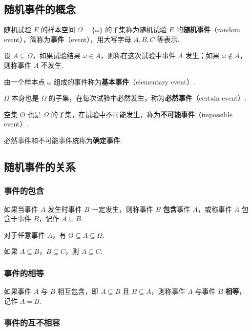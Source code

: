 \subsection{随机事件的概念}

随机试验 $E$ 的样本空间 $\varOmega = \{ \omega \}$ 的子集称为随机试验 $E$ 的\textbf{随机事件}（random event），简称为\textbf{事件}（event），用大写字母 $A,B,C$ 等表示.

设 $A \subseteq \varOmega$，如果试验结果 $\omega \in A$，则称在这次试验中事件 $A$ 发生；如果 $\omega \notin A$，则称事件 $A$ 不发生.

由一个样本点 $\omega$ 组成的事件称为\textbf{基本事件}（elementary event）.

$\varOmega$ 本身也是 $\varOmega$ 的子集，在每次试验中必然发生，称为\textbf{必然事件}（certain event）.

空集 $\text{\O}$ 也是 $\varOmega$ 的子集，在试验中不可能发生，称为\textbf{不可能事件}（impossible event）.

必然事件和不可能事件统称为\textbf{确定事件}.

\subsection{随机事件的关系}

\subsubsection{事件的包含}

如果当事件 $A$ 发生时事件 $B$ 一定发生，则称事件 $B$ \textbf{包含}事件 $A$，或称事件 $A$ 包含于事件 $B$，记作 $A \subseteq B$.

\begin{property}
    \indent 对于任意事件 $A$，有 $\text{\O} \subseteq A \subseteq \varOmega$.
\end{property}

\begin{property}
    \indent 如果 $A \subseteq B$，$B \subseteq C$，则 $A\subseteq C$.
\end{property}

\subsubsection{事件的相等}

如果事件 $A$ 与 $B$ 相互包含，即 $A \subseteq B$ 且 $B \subseteq A$，则称事件 $A$ 与事件 $B$ \textbf{相等}，记作 $A=B$.

\subsubsection{事件的互不相容}

